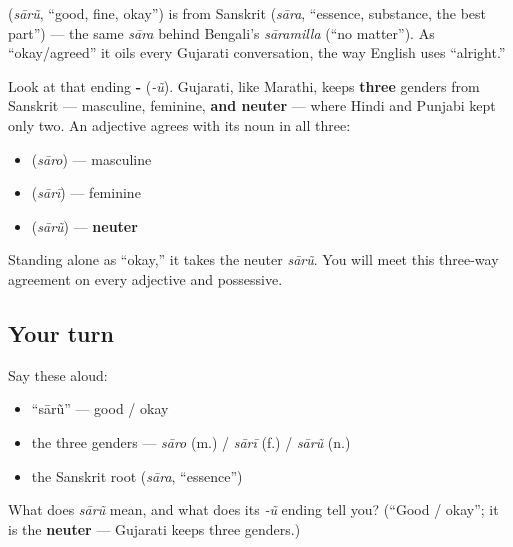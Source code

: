 \begin{cousinweb}
\textbf{} (\emph{sārũ}, \textquotedblleft{}good, fine, okay\textquotedblright{}) is from Sanskrit \textbf{} (\emph{sāra}, \textquotedblleft{}essence, substance, the best part\textquotedblright{}) — the same \emph{sāra} behind Bengali's \emph{sāramilla} (\textquotedblleft{}no matter\textquotedblright{}). As \textquotedblleft{}okay/agreed\textquotedblright{} it oils every Gujarati conversation, the way English uses \textquotedblleft{}alright.\textquotedblright{}
\end{cousinweb}

\begin{grammarlens}[title={Grammar Lens: three genders, on the adjective}]
Look at that ending \textbf{-} (\emph{-ũ}). Gujarati, like Marathi, keeps \textbf{three} genders from Sanskrit — masculine, feminine, \textbf{and neuter} — where Hindi and Punjabi kept only two. An adjective agrees with its noun in all three:

\begin{itemize}
\raggedright
  \item \textbf{} (\emph{sāro}) — masculine
  \item \textbf{} (\emph{sārī}) — feminine
  \item \textbf{} (\emph{sārũ}) — \textbf{neuter}
\end{itemize}

Standing alone as \textquotedblleft{}okay,\textquotedblright{} it takes the neuter \emph{sārũ}. You will meet this three-way agreement on every adjective and possessive.
\end{grammarlens}

\subsection*{Your turn}
Say these aloud:

\begin{itemize}
\raggedright
  \item \textquotedblleft{}sārũ\textquotedblright{} — good / okay
  \item the three genders — \emph{sāro} (m.) / \emph{sārī} (f.) / \emph{sārũ} (n.)
  \item the Sanskrit root (\emph{sāra}, \textquotedblleft{}essence\textquotedblright{})
\end{itemize}

\begin{tcolorbox}[breakable,colback=teal!4,colframe=teal!35!black,title={Before you move on}]
What does \emph{sārũ} mean, and what does its \emph{-ũ} ending tell you? (\textquotedblleft{}Good / okay\textquotedblright{}; it is the \textbf{neuter} — Gujarati keeps three genders.)
\end{tcolorbox}
